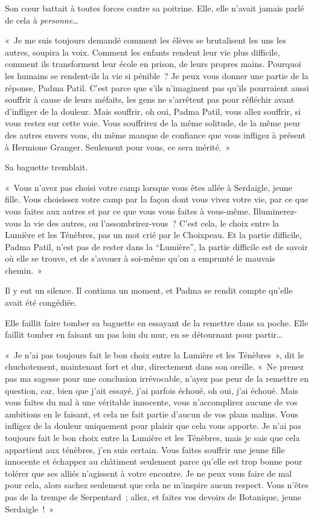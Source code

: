 Son cœur battait à toutes forces contre sa poitrine.
Elle, elle n'avait jamais parlé de cela à \emph{personne}…

«~Je me suis toujours demandé comment les élèves se brutalisent les uns les autres, soupira la voix.
Comment les enfants rendent leur vie plus difficile, comment ils transforment leur école en prison, de leurs propres mains.
Pourquoi les humains se rendent-ils la vie si pénible~?
Je peux vous donner une partie de la réponse, Padma Patil.
C'est parce que s'ils n'imaginent pas qu'ils pourraient aussi souffrir à cause de leurs méfaits, les gens ne s'arrêtent pas pour réfléchir avant d'infliger de la douleur.
Mais souffrir, oh oui, Padma Patil, vous allez souffrir, si vous restez sur cette voie.
Vous souffrirez de la même solitude, de la même peur des autres envers vous, du même manque de confiance que vous infligez à présent à Hermione Granger.
Seulement pour vous, ce sera mérité.~»

Sa baguette tremblait.

«~Vous n'avez pas choisi votre camp lorsque vous êtes allée à Serdaigle, jeune fille.
Vous choisissez votre camp par la façon dont vous vivez votre vie, par ce que vous faites aux autres et par ce que vous vous faites à vous-même.
Illuminerez-vous la vie des autres, ou l'assombrirez-vous~?
C'est cela, le choix entre la Lumière et les Ténèbres, pas un mot crié par le Choixpeau.
Et la partie difficile, Padma Patil, n'est pas de rester dans la “Lumière”, la partie difficile est de savoir où elle se trouve, et de s'avouer à soi-même qu'on a emprunté le mauvais chemin.~»

Il y eut un silence.
Il continua un moment, et Padma se rendit compte qu'elle avait été congédiée.

Elle faillit faire tomber sa baguette en essayant de la remettre dans sa poche.
Elle faillit tomber en faisant un pas loin du mur, en se détournant pour partir…

«~Je n'ai pas toujours fait le bon choix entre la Lumière et les Ténèbres~», dit le chuchotement, maintenant fort et dur, directement dans son oreille.
«~Ne prenez pas ma sagesse pour une conclusion irrévocable, n'ayez pas peur de la remettre en question, car, bien que j'ait essayé, j'ai parfois échoué, oh oui, j'ai échoué.
Mais vous faites du mal à une véritable innocente, vous n'accomplirez aucune de vos ambitions en le faisant, et cela ne fait partie d'aucun de vos plans malins.
Vous infligez de la douleur uniquement pour plaisir que cela vous apporte.
Je n'ai pas toujours fait le bon choix entre la Lumière et les Ténèbres, mais je sais que cela appartient aux ténèbres, j'en suis certain.
Vous faites souffrir une jeune fille innocente et échappez au châtiment seulement parce qu'elle est trop bonne pour tolérer que ses alliés n'agissent à votre encontre.
Je ne peux vous faire de mal pour cela, alors sachez seulement que cela ne m'inspire aucun respect.
Vous n'êtes pas de la trempe de Serpentard~; allez, et faites vos devoirs de Botanique, jeune Serdaigle~!~»

